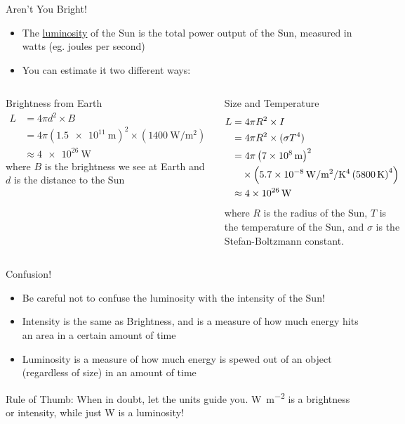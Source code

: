 \documentclass[pdf, aspectratio=169]{beamer}
\begin{document}
\begin{frame}{Aren't You Bright!}
  \begin{itemize}
	\item The \underline{luminosity} of the Sun is the total power output of the Sun, measured in watts (eg. joules per second)
	\item You can estimate it two different ways:
  \end{itemize}
  \begin{columns}[t]
	\begin{block}{Brightness from Earth}
	  \scriptsize
	  \begin{align*}
		L &= 4\pi d^2 \times B \\
		&= 4\pi\left( \SI{1.5e11}{\meter} \right)^2 \times \left( \SI{1400}{\watt\per\square\meter} \right) \\
		&\approx \SI{4e26}{\watt}
	  \end{align*}
	  where $B$ is the brightness we see at Earth and $d$ is the distance to the Sun
	\end{block}
	\begin{block}{Size and Temperature}
	  \scriptsize
	  \begin{align*}
		L &= 4\pi R^2 \times I \\
		&= 4\pi R^2 \times (\sigma T^4) \\
		&= 4\pi \left( \SI{7e8}{\meter} \right)^2\\
		&\quad\times \left( \SI{5.7E-8}{\watt\per\square\meter\per\kelvin^4} \left( \SI{5800}{\kelvin} \right)^4 \right)\\
		&\approx \SI{4e26}{\watt}
	  \end{align*}
	  where $R$ is the radius of the Sun, $T$ is the temperature of the Sun, and $\sigma$ is the Stefan-Boltzmann constant.
	\end{block}
  \end{columns}
\end{frame}

\begin{frame}{Confusion!}
  \begin{itemize}
	\item Be careful not to confuse the \alert{luminosity} with the \alert{intensity} of the Sun!
	\item Intensity is the same as Brightness, and is a measure of how much energy hits an \alert{area} in a certain amount of time
	\item Luminosity is a measure of how much energy is spewed out of an object (regardless of size) in an amount of time
  \end{itemize}
  \begin{alertblock}{Rule of Thumb:}
	When in doubt, let the units guide you. \si{\watt\per\meter^2} is a brightness or intensity, while just \si{\watt} is a luminosity!
  \end{alertblock}
\end{frame}
\end{document}

